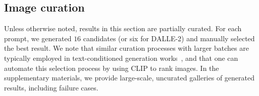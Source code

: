 

\subsection{Image curation}

Unless otherwise noted, results in this section are partially curated. For each prompt, we generated $16$ candidates (or six for DALLE-2) and manually selected the best result. We note that similar curation processes with larger batches are typically employed in text-conditioned generation works~\citep{avrahami2022blended,ramesh2021zero,yu2022scaling}, and that one can automate this selection process by using CLIP to rank images. In the supplementary materials, we provide large-scale, uncurated galleries of generated results, including failure cases.
